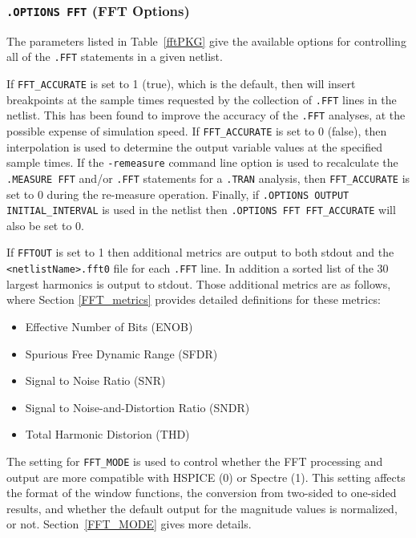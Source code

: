 

\subsubsection{\texttt{.OPTIONS FFT} (FFT Options)}
The parameters listed in Table~\ref{fftPKG} give the available
options for controlling all of the \texttt{.FFT} statements in
a given \Xyce{} netlist.

If \texttt{FFT\_ACCURATE} is set to 1 (true), which is the default, then
\Xyce{} will insert breakpoints at the sample times requested by the
collection of \texttt{.FFT} lines in the netlist.  This has been found
to improve the accuracy of the \texttt{.FFT} analyses, at the possible
expense of simulation speed.  If \texttt{FFT\_ACCURATE} is set to
0 (false), then interpolation is used to determine the output variable
values at the specified sample times.  If the \texttt{-remeasure} command
line option is used to recalculate the \texttt{.MEASURE FFT} and/or
\texttt{.FFT} statements for a \texttt{.TRAN} analysis, then
\texttt{FFT\_ACCURATE} is set to 0 during the re-measure operation.  Finally,
if \texttt{.OPTIONS OUTPUT INITIAL\_INTERVAL} is used in the netlist
then \texttt{.OPTIONS FFT FFT\_ACCURATE} will also be set to 0.

If \texttt{FFTOUT} is set to 1 then additional metrics are output to both stdout
and the \verb+<netlistName>.fft0+ file for each \texttt{.FFT} line.  In
addition a sorted list of the 30 largest harmonics is output to stdout.
Those additional metrics are as follows, where Section \ref{FFT_metrics}
provides detailed definitions for these metrics:

\begin{itemize}
  \item Effective Number of Bits (ENOB)
  \item Spurious Free Dynamic Range (SFDR)
  \item Signal to Noise Ratio (SNR)
  \item Signal to Noise-and-Distortion Ratio (SNDR)
  \item Total Harmonic Distorion (THD)
\end{itemize}

The setting for \texttt{FFT\_MODE} is used to control whether the \Xyce{} FFT
processing and output are more compatible with HSPICE (0) or Spectre (1).
This setting affects the format of the window functions, the conversion from
two-sided to one-sided results, and whether the default output for the
magnitude values is normalized, or not.  Section~\ref{FFT_MODE} gives
more details.

